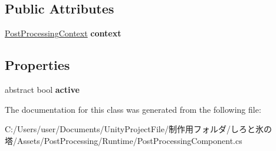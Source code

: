 \subsection*{Public Attributes}
\begin{DoxyCompactItemize}
\item 
\mbox{\label{class_unity_engine_1_1_post_processing_1_1_post_processing_component_base_a2253833defff1ca009222538992a92fd}} 
\hyperlink{class_unity_engine_1_1_post_processing_1_1_post_processing_context}{Post\+Processing\+Context} {\bfseries context}
\end{DoxyCompactItemize}
\subsection*{Properties}
\begin{DoxyCompactItemize}
\item 
\mbox{\label{class_unity_engine_1_1_post_processing_1_1_post_processing_component_base_a2ede55be3b7f31c1628341f5d0fe7b77}} 
abstract bool {\bfseries active}
\end{DoxyCompactItemize}


The documentation for this class was generated from the following file\+:\begin{DoxyCompactItemize}
\item 
C\+:/\+Users/user/\+Documents/\+Unity\+Project\+File/制作用フォルダ/しろと氷の塔/\+Assets/\+Post\+Processing/\+Runtime/Post\+Processing\+Component.\+cs\end{DoxyCompactItemize}
